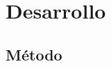 \documentclass[a4paper,10pt,twoside]{article}
\begin{document}









\section{Desarrollo}


\subsection{Método}
\end{document}

